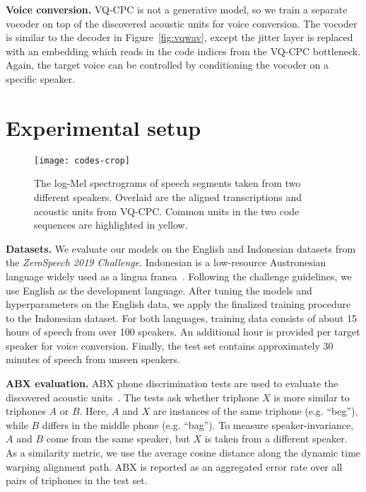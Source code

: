 \documentclass[a4paper]{article}
\newcommand{\imagesep}{\vspace*{-4pt}}
\begin{document}
\textbf{Voice conversion.}
VQ-CPC is not a generative model, so we train a separate vocoder on top of the discovered acoustic units for voice conversion.
The vocoder is similar to the decoder in Figure~\ref{fig:vqwav}, except the jitter layer is replaced with an embedding which reads in the code indices from the VQ-CPC bottleneck. Again, the target voice can be controlled by conditioning the vocoder on a specific speaker.


 \section{Experimental setup}
\label{sec:setup}

\begin{figure*}[t]
    \centering
    \texttt{[image: codes-crop]}
        \imagesep
    \caption{
    The log-Mel spectrograms of speech segments taken from two different speakers. Overlaid are the aligned transcriptions and acoustic units from VQ-CPC. Common units in the two code sequences are highlighted in yellow.
}
    \label{fig:codes}
\end{figure*}

\indent\textbf{Datasets.} 
We evaluate our models on the English and Indonesian datasets from the \textit{ZeroSpeech 2019 Challenge}.
Indonesian is a low-resource Austronesian language widely used as a lingua franca~\cite{sakti+etal_ococosda08,sakti+etal_tcast08}. 
Following the challenge guidelines, we use English as the development language. 
After tuning the models and hyperparameters on the English data, we apply the finalized training procedure to the Indonesian dataset.
For both languages, training data consists of about 15 hours of speech from over 100 speakers. 
An additional hour is provided per target speaker for voice conversion.
Finally, the test set contains approximately 30 minutes of speech from unseen speakers.

\textbf{ABX evaluation.} 
ABX phone discrimination tests are used to evaluate the discovered acoustic units~\cite{schatz+etal_interspeech13}.
The tests ask whether triphone $X$ is more similar to triphones $A$ or $B$.
Here, $A$ and $X$ are instances of the same triphone (e.g. ``beg''), while $B$ differs in the middle phone (e.g. ``bag'').
To measure speaker-invariance, $A$ and $B$ come from the same speaker, but $X$ is taken from a different speaker.
As a similarity metric, we use the average cosine distance along the dynamic time warping alignment path.
ABX is reported as an aggregated error rate over all pairs of triphones in the test set.
\end{document}
